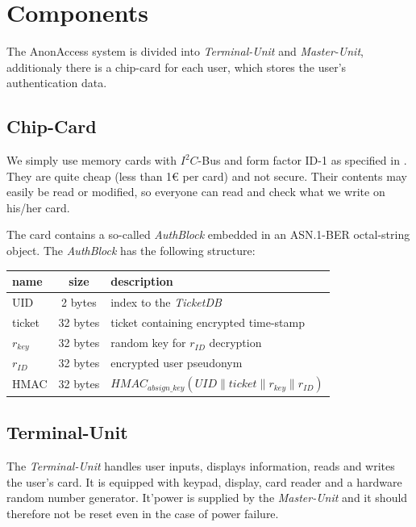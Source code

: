%

\section{Components}
The AnonAccess system is divided into \textit{Terminal-Unit} and \textit{Master-Unit}, additionaly there is a chip-card for each user, which stores the user's authentication data.


\subsection{Chip-Card}
We simply use memory cards with $I^2C$-Bus\cite{I2C} and form factor ID-1 as specified in \cite{ISO7816-1}\cite{ISO7816-2}. They are quite cheap (less than 1\euro{} per card) and not secure. Their contents may easily be read or modified, so everyone can read and check what we write on his/her card.

The card contains a so-called \textit{AuthBlock} embedded in an ASN.1-BER\cite{ASN.1BER} octal-string object.
The \textit{AuthBlock} has the following structure:\\
\begin{tabular}{|l|c|l|} \hline
name       & size     & description \\ \hline 
UID        & 2 bytes  & index to the \textit{TicketDB} \\
ticket     & 32 bytes & ticket containing encrypted time-stamp \\
$r_{key}$  & 32 bytes & random key for $r_{ID}$ decryption \\
$r_{ID}$   & 32 bytes & encrypted user pseudonym \\
HMAC       & 32 bytes & $HMAC_{absign\_key}(UID \parallel ticket \parallel r_{key} \parallel r_{ID})$\\ \hline
\end{tabular} 

\subsection{Terminal-Unit}
The \textit{Terminal-Unit} handles user inputs, displays information, reads and writes the user's card.
It is equipped with keypad, display, card reader and a hardware random number generator. It'power is supplied by the \textit{Master-Unit} and it should therefore not be reset even in the case of power failure.

